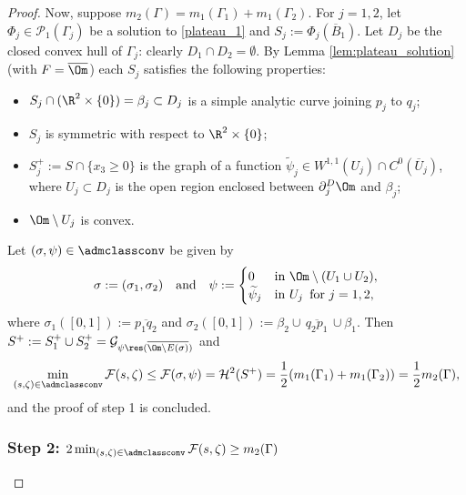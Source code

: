\begin{proof}
Now, suppose $m_2(\Gamma)=m_1(\Gamma_1)+m_1(\Gamma_2)$.
For $j=1,2$,
let $\Phi_j\in \mathcal{P}_1(\Gamma_j)$ be a solution to \eqref{plateau_1}
and $S_j:=\Phi_j(\overline B_1)$.
Let $D_j$ be the closed convex hull of $\Gamma_j$: clearly $D_1\cap D_2=\emptyset$. By Lemma \ref{lem:plateau_solution} (with $F=\overline\Om$) each $S_j$ satisfies the following properties:
\begin{itemize}
\item $S_j\cap(\R^2\times\{0\})=\beta_j\subset D_j$ is a simple {analytic} curve joining $p_j$ to $q_j$;
\item $S_j$ is symmetric with respect to $\R^2\times\{0\}$;
\item $S_j^+:=S\cap\{x_3\ge0\}$ is the graph of a function $\widetilde \psi_j\in W^{1,1}(U_j)\cap C^0(\overline U_j)$, where $U_j\subset D_j$ is the open region enclosed between $\partial^D_j\Om$ and $\beta_j$;
\item
$\Om\setminus U_j$ is convex.
\end{itemize}
Let $(\sigma,\psi)\in\admclassconv$ be given by
\begin{equation*}
\sigma:=(\sigma_1,\sigma_2)\quad\text{and}\quad\psi:=\begin{cases}
0&\text{in } \Om\setminus (U_1\cup U_2),\\
\widetilde{\psi}_j&\text{in } U_j\, \text{ for }j=1,2,
\end{cases}
\end{equation*}
where $\sigma_1([0,1]):=\overline{p_1q_2}$
and $\sigma_2([0,1]):=\beta_2\cup\,\overline{q_2p_1}\,\cup\beta_1$.
Then $S^+:=S^+_1\cup S^+_2=\mathcal{G}_{\psi\res(\overline{\Om\setminus E(\sigma)})}$ and
\begin{equation*}
\min_{(s,\zeta)\in\admclassconv}\mathcal{F}(s,\zeta)\le \mathcal{F}(\sigma,\psi)=\mathcal{H}^2(S^+)=\frac12(m_1(\Gamma_1)+m_1(\Gamma_2))=\frac12m_2(\Gamma),
\end{equation*}
and the proof of step 1 is concluded.

\subsubsection*{Step 2:
$2\min_{(s,\zeta)\in \admclassconv}\mathcal F(s,\zeta)\ge m_2(\Gamma)$}


\end{proof}
